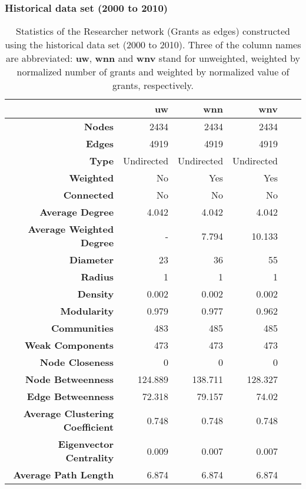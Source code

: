 \clearpage

\subsubsection{Historical data set (2000 to 2010)}

\begin{table}[!htbp]
\centering
\caption[Statistics of the Researcher network (Grants as edges) constructed using the historical data set (2000 to 2010)]{Statistics of the Researcher network (Grants as edges) constructed using the historical data set (2000 to 2010). Three of the column names are abbreviated: \textbf{uw}, \textbf{wnn} and \textbf{wnv} stand for unweighted, weighted by normalized number of grants and weighted by normalized value of grants, respectively.}
\label{table:researcher_b_past1_stats_appendix}
\begin{tabular}{r|rrrrr}
\textbf{} & \textbf{uw} & \textbf{wnn} & \textbf{wnv}\\
\hline
\textbf{Nodes} & {2434} & {2434} & {2434}\\
\textbf{Edges} & {4919} & {4919} & {4919}\\
\textbf{Type} & {Undirected} & {Undirected} & {Undirected}\\
\textbf{Weighted} & {No} & {Yes} & {Yes}\\
\textbf{Connected} & {No} & {No} & {No}\\
\textbf{Average Degree} & {4.042} & {4.042} & {4.042}\\
\textbf{Average Weighted Degree} & {-} & {7.794} & {10.133}\\
\textbf{Diameter} & {23} & {36} & {55}\\
\textbf{Radius} & {1} & {1} & {1}\\
\textbf{Density} & {0.002} & {0.002} & {0.002}\\
\textbf{Modularity} & {0.979} & {0.977} & {0.962}\\
\textbf{Communities} & {483} & {485} & {485}\\
\textbf{Weak Components} & {473} & {473} & {473}\\
\textbf{Node Closeness} & {0} & {0} & {0}\\
\textbf{Node Betweenness} & {124.889} & {138.711} & {128.327}\\
\textbf{Edge Betweenness} & {72.318} & {79.157} & {74.02}\\
\textbf{Average Clustering Coefficient} & {0.748} & {0.748} & {0.748}\\
\textbf{Eigenvector Centrality} & {0.009} & {0.007} & {0.007}\\
\textbf{Average Path Length} & {6.874} & {6.874} & {6.874}
\end{tabular}
\end{table}

